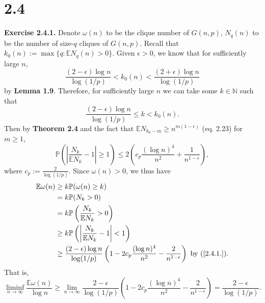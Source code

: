 \documentclass[12pt]{extarticle}
\begin{document}
\section*{2.4}
\textbf{Exercise 2.4.1.} Denote $\omega(n)$ to be the clique number of $G(n,p)$, $N_q(n)$ to be the number of size-$q$ cliques of $G(n,p)$. Recall that $k_0(n):=\max\{q:\mathbb{E}N_q(n)>0\}$. Given $\epsilon>0$, we know that for sufficiently large $n$,
\[
\frac{(2-\epsilon)\log n}{\log(1/p)}<k_0(n)<\frac{(2+\epsilon)\log n}{\log(1/p)}
\]
by \textbf{Lemma 1.9}. Therefore, for sufficiently large $n$ we can take some $k\in\mathbb{N}$ such that
\[
\frac{(2-\epsilon)\log n}{\log(1/p)}\leq k<k_0(n).
\]
Then by \textbf{Theorem 2.4} and the fact that $\mathbb{E}N_{k_0-m}\geq n^{m(1-\epsilon)}$ (eq. 2.23) for $m\geq 1$,
\begin{equation}
\mathbb{P}\left(\left|\frac{N_k}{\mathbb{E}N_k}-1\right|\geq 1\right)
\leq
2\left(c_p\frac{(\log n)^4}{n^2}+\frac{1}{n^{1-\epsilon}}\right),
\label{2.4.1.}
\end{equation}
where $c_p:=\frac{2}{\log(1/p)}$.
Since $\omega(n)>0$, we thus have
\[
\begin{aligned}
\mathbb{E}\omega(n) &\geq k\mathbb{P}(\omega(n)\geq k) \\
&=
k\mathbb{P}(N_k>0) \\
&=
k\mathbb{P}\left(\frac{N_k}{\mathbb{E}N_k}>0\right) \\&
\geq
k\mathbb{P}\left(\left|\frac{N_k}{\mathbb{E}N_k}-1\right|<1\right) \\
&\geq
\frac{(2-\epsilon)\log n}{\log(1/p)}\left(1-2c_p\frac{(\log n)^4}{n^2}-\frac{2}{n^{1-\epsilon}}\right)\text{ by (\ref{2.4.1.}).}
\end{aligned}
\]
That is,
\begin{equation}
\liminf_{n\rightarrow\infty}\frac{\mathbb{E}\omega(n)}{\log n}
\geq
\lim_{n\rightarrow\infty}\frac{2-\epsilon}{\log(1/p)}\left(1-2c_p\frac{(\log n)^4}{n^2}-\frac{2}{n^{1-\epsilon}}\right)=\frac{2-\epsilon}{\log(1/p)}.
\label{2.4.lowerbound}
\end{equation}
\end{document}
